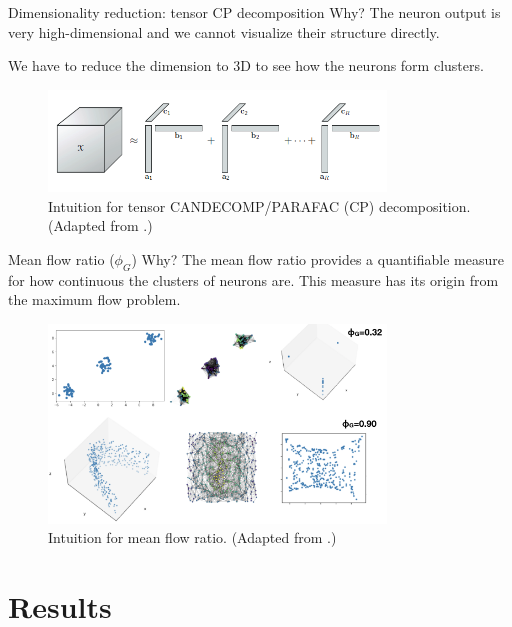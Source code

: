 \documentclass[xcolor={dvipsnames,svgnames}]{beamer}
\begin{document}
\begin{frame}{Dimensionality reduction: tensor CP decomposition}
Why? The neuron output is very high-dimensional and we cannot visualize their structure directly. 

We have to reduce the dimension to 3D to see how the neurons form clusters.
    \begin{figure}[H]
        \centering
            \includegraphics[width=0.8\textwidth]{figures-tensor/cp-decomp.png}
            \caption{Intuition for tensor CANDECOMP/PARAFAC (CP) decomposition. (Adapted from \cite{Kol2009}.)}
        \end{figure} 
\end{frame}
\begin{frame}{Mean flow ratio ($\phi_G$)}
Why? The mean flow ratio provides a quantifiable measure for how continuous the clusters of neurons are. This measure has its origin from the maximum flow problem. 
  \begin{figure}[H]
        \centering
         \includegraphics[width=0.8\textwidth]{presentation/embeddings/mean-flow-ratio.PNG}
            \caption{Intuition for mean flow ratio. (Adapted from \cite{dyballa_manifold_2021}.)}
        \end{figure} 
\end{frame}

\section{Results}

\end{document}
